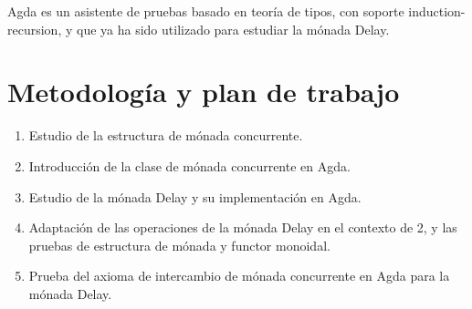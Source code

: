 \documentclass[11pt,a4paper]{article}
\begin{document}
Agda es un asistente de pruebas basado en teoría de tipos, con soporte
induction-recursion, y que ya ha sido utilizado para estudiar la
mónada Delay.

\section{Metodología y plan de trabajo}

\begin{enumerate}

\item Estudio de la estructura de mónada concurrente.

\item Introducción de la clase de mónada concurrente en Agda.

\item Estudio de la mónada Delay y su implementación en Agda.

\item Adaptación de las operaciones de la mónada Delay en el contexto de
2, y las pruebas de estructura de mónada y functor monoidal.

\item Prueba del axioma de intercambio de mónada concurrente en Agda
para la mónada Delay.

\end{enumerate}



\end{document}
